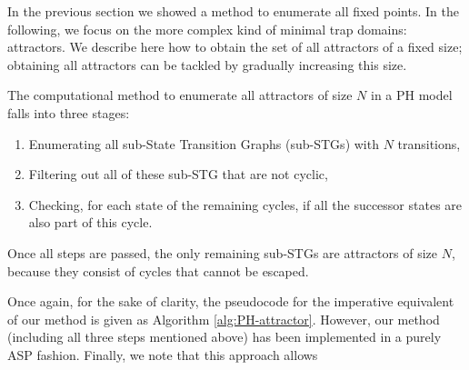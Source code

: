 
In the previous section we showed a method to enumerate all fixed points.
In the following, we focus on the more complex kind of minimal trap domains: attractors.
We describe here how to obtain the set of all attractors of a fixed size;
obtaining all attractors can be tackled by gradually increasing this size.

The computational method to enumerate all attractors of size $N$ in a PH model falls into three stages:
\begin{enumerate}
  \item Enumerating all sub-State Transition Graphs (sub-STGs)
    with $N$ transitions,
  \item Filtering out all of these sub-STG that are not cyclic,
  \item Checking, for each state of the remaining cycles,
    if all the successor states are also part of this cycle.
\end{enumerate}
Once all steps are passed, the only remaining sub-STGs are attractors of size $N$,
because they consist of cycles that cannot be escaped.

Once again, for the sake of clarity,
the pseudocode for the imperative equivalent of our method is given as Algorithm \ref{alg:PH-attractor}.
However, our method (including all three steps mentioned above) has been implemented in a purely ASP fashion.
Finally, we note that this approach allows 

